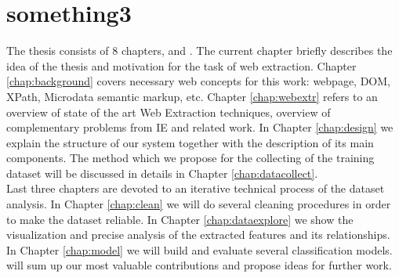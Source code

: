 \section{something3}
The thesis consists of 8 chapters,  and . The current chapter briefly describes the idea of the thesis and motivation for the task of web extraction. Chapter \ref{chap:background} covers necessary web concepts for this work: webpage, DOM, XPath, Microdata semantic markup, etc. Chapter \ref{chap:webextr} refers to an overview of state of the art Web Extraction techniques, overview of complementary problems from IE and related work. In Chapter \ref{chap:design} we explain the structure of our system together with the description of its main components. The method which we propose for the collecting of the training dataset will be discussed in details in Chapter \ref{chap:datacollect}. \\

Last three chapters are devoted to an iterative technical process of the dataset analysis. In Chapter \ref{chap:clean} we will do several cleaning procedures in order to make the dataset reliable. In Chapter \ref{chap:dataexplore} we show the visualization and precise analysis of the extracted features and its relationships. In Chapter \ref{chap:model} we will build  and evaluate several classification models.  will sum up our most valuable contributions and propose ideas for further work.
